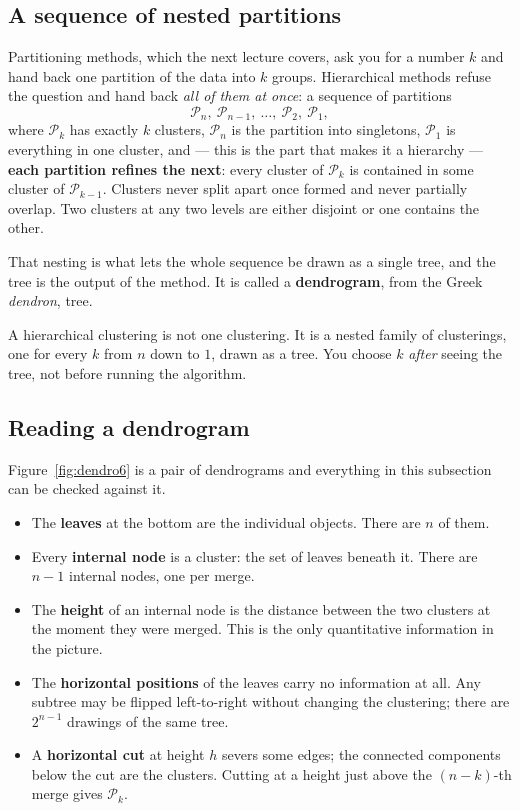 \documentclass[11pt]{article}
\begin{document}
\subsection{A sequence of nested partitions}

Partitioning methods, which the next lecture covers, ask you for a number $k$
and hand back one partition of the data into $k$ groups. Hierarchical methods
refuse the question and hand back \emph{all of them at once}: a sequence of
partitions
\[
  \mathcal{P}_n,\ \mathcal{P}_{n-1},\ \ldots,\ \mathcal{P}_2,\ \mathcal{P}_1,
\]
where $\mathcal{P}_k$ has exactly $k$ clusters, $\mathcal{P}_n$ is the
partition into singletons, $\mathcal{P}_1$ is everything in one cluster, and
--- this is the part that makes it a hierarchy --- \textbf{each partition
refines the next}: every cluster of $\mathcal{P}_{k}$ is contained in some
cluster of $\mathcal{P}_{k-1}$. Clusters never split apart once formed and
never partially overlap. Two clusters at any two levels are either disjoint or
one contains the other.

That nesting is what lets the whole sequence be drawn as a single tree, and the
tree is the output of the method. It is called a \textbf{dendrogram}, from the
Greek \emph{dendron}, tree.

\begin{keyidea}
A hierarchical clustering is not one clustering. It is a nested family of
clusterings, one for every $k$ from $n$ down to $1$, drawn as a tree. You
choose $k$ \emph{after} seeing the tree, not before running the algorithm.
\end{keyidea}

\subsection{Reading a dendrogram}

Figure~\ref{fig:dendro6} is a pair of dendrograms and everything in this
subsection can be checked against it.

\begin{itemize}[leftmargin=*]
  \item The \textbf{leaves} at the bottom are the individual objects. There
    are $n$ of them.
  \item Every \textbf{internal node} is a cluster: the set of leaves beneath
    it. There are $n-1$ internal nodes, one per merge.
  \item The \textbf{height} of an internal node is the distance between the
    two clusters at the moment they were merged. This is the only quantitative
    information in the picture.
  \item The \textbf{horizontal positions} of the leaves carry no information
    at all. Any subtree may be flipped left-to-right without changing the
    clustering; there are $2^{n-1}$ drawings of the same tree.
  \item A \textbf{horizontal cut} at height $h$ severs some edges; the
    connected components below the cut are the clusters. Cutting at a height
    just above the $(n-k)$-th merge gives $\mathcal{P}_k$.
\end{itemize}
\end{document}
